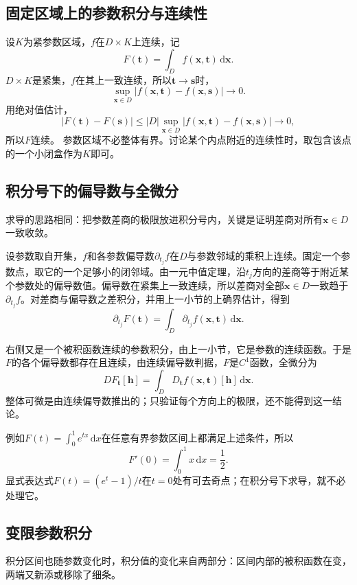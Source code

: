 \subsection{固定区域上的参数积分与连续性}

设$K$为紧参数区域，$f$在$D\times K$上连续，记
\[
 F(\bm t)=\int_D f(\bm x,\bm t)\,\mathrm d\bm x.
\]
$D\times K$是紧集，$f$在其上一致连续，所以$\bm t\to\bm s$时，
\[
 \sup_{\bm x\in D}|f(\bm x,\bm t)-f(\bm x,\bm s)|\longrightarrow0.
\]
用绝对值估计，
\[
 |F(\bm t)-F(\bm s)|
 \leq |D|\sup_{\bm x\in D}|f(\bm x,\bm t)-f(\bm x,\bm s)|\longrightarrow0,
\]
所以$F$连续。
参数区域不必整体有界。讨论某个内点附近的连续性时，取包含该点的一个小闭盒作为$K$即可。

\subsection{积分号下的偏导数与全微分}

求导的思路相同：把参数差商的极限放进积分号内，关键是证明差商对所有$\bm x\in D$一致收敛。

设参数取自开集，$f$和各参数偏导数$\partial_{t_j}f$在$D$与参数邻域的乘积上连续。固定一个参数点，取它的一个足够小的闭邻域。由一元中值定理，沿$t_j$方向的差商等于附近某个参数处的偏导数值。偏导数在紧集上一致连续，所以差商对全部$\bm x\in D$一致趋于$\partial_{t_j}f$。对差商与偏导数之差积分，并用上一小节的上确界估计，得到
\begin{equation}
 \partial_{t_j}F(\bm t)=\int_D\partial_{t_j}f(\bm x,\bm t)\,\mathrm d\bm x.
\label{eq:classical-differentiate-under-integral}
\end{equation}

右侧又是一个被积函数连续的参数积分，由上一小节，它是参数的连续函数。于是$F$的各个偏导数都存在且连续，由连续偏导数判据，$F$是$C^1$函数，全微分为
\[
 DF_{\bm t}[\bm h]=\int_D D_{\bm t}f(\bm x,\bm t)[\bm h]\,\mathrm d\bm x.
\]
整体可微是由连续偏导数推出的；只验证每个方向上的极限，还不能得到这一结论。

例如$F(t)=\int_0^1 e^{tx}\,\mathrm dx$在任意有界参数区间上都满足上述条件，所以
\[
 F'(0)=\int_0^1x\,\mathrm dx=\frac12.
\]
显式表达式$F(t)=(e^t-1)/t$在$t=0$处有可去奇点；在积分号下求导，就不必处理它。

\subsection{变限参数积分}

积分区间也随参数变化时，积分值的变化来自两部分：区间内部的被积函数在变，两端又新添或移除了细条。

